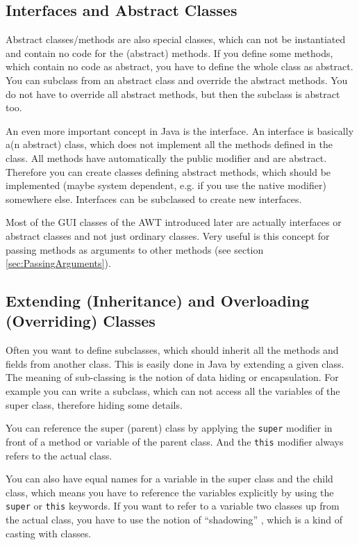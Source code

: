 \subsection{Interfaces and Abstract Classes}
Abstract classes/methods 
are also special classes, which can not be instantiated
and contain no code for the (abstract) methods. If you define
some methods, which contain no code as abstract, you have to 
define the whole class as abstract. You can subclass from an 
abstract class and override the abstract methods. You do not have
to override all abstract methods, but then the subclass is abstract
too.

An even more important concept in Java is the interface.
An interface is basically a(n abstract) class, which does not implement 
all the
methods defined in the class. All methods have automatically the public
modifier and are abstract.
Therefore you can create classes defining abstract methods,
which should be implemented (maybe system dependent, e.g. if you use
the native modifier) somewhere else. Interfaces can be subclassed
to create new interfaces.

Most of the GUI classes of the AWT introduced later are
actually interfaces or abstract classes and not just ordinary classes.
Very useful is this concept for passing methods as arguments to
other methods (see section \ref{sec:PassingArguments}).


\subsection{Extending (Inheritance) and Overloading (Overriding) Classes}
Often you want to define subclasses, which should inherit all
the methods and fields from another class. This is easily done
in Java by extending a given class. The meaning of sub-classing is the
notion of data hiding or encapsulation. For example you can write
a subclass, which can not access all the variables of the super class,
therefore hiding some details. 

You can reference the super (parent) class by applying the
\verb|super| modifier in front of a method or variable of
the parent class. And the \verb|this| modifier always refers to
the actual class. 

You can also have equal names for a variable in the super class and the
child class, which means you have to reference the variables explicitly
by using the \verb|super| or \verb|this| keywords. If you want to refer
to a variable two classes up from the actual class, you have to use
the notion of ``shadowing'' \cite[]{javanutshell}, which is a kind of
casting with classes. 

